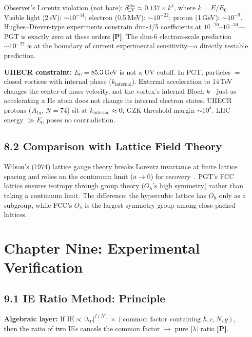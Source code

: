 \documentclass[11pt,a4paper]{article}
\newcommand{\gradeP}{\textbf{[P]}}
\begin{document}
Observer's Lorentz violation (not bare): $\delta_{\mathrm{LV}}^{\mathrm{obs}}\approx 0.137\times k^4$, where $k=E/E_0$. Visible light (2\,eV): $\sim 10^{-44}$; electron (0.5\,MeV): $\sim 10^{-22}$; proton (1\,GeV): $\sim 10^{-9}$. Hughes--Drever-type experiments constrain dim-4/5 coefficients at $10^{-20}$--$10^{-30}$---PGT is exactly zero at these orders \gradeP. The dim-6 electron-scale prediction $\sim 10^{-22}$ is at the boundary of current experimental sensitivity---a directly testable prediction.

\textbf{UHECR constraint:} $E_0=85.3$\,GeV is not a UV cutoff. In PGT, particles $=$ closed vortices with internal phase ($k_{\mathrm{internal}}$). External acceleration to 14\,TeV changes the center-of-mass velocity, not the vortex's internal Bloch $k$---just as accelerating a He atom does not change its internal electron states. UHECR protons ($A_{1g}$, $N=74$) sit at $k_{\mathrm{internal}}\approx 0$; GZK threshold margin $\sim 10^4$. LHC energy $\gg E_0$ poses no contradiction.

\subsection{8.2 Comparison with Lattice Field Theory}

Wilson's (1974) lattice gauge theory breaks Lorentz invariance at finite lattice spacing and relies on the continuum limit ($a\to 0$) for recovery~\cite{wilson}. PGT's FCC lattice ensures isotropy through group theory ($O_h$'s high symmetry) rather than taking a continuum limit. The difference: the hypercubic lattice has $O_h$ only as a subgroup, while FCC's $O_h$ is the largest symmetry group among close-packed lattices.

\section{Chapter Nine: Experimental Verification}\label{sec:ch9}

\subsection{9.1 IE Ratio Method: Principle}

\textbf{Algebraic layer:} If $\mathrm{IE}\propto|\lambda_\Gamma|^{f(N)}\times(\text{common factor containing }\hbar,c,N,g)$, then the ratio of two IEs cancels the common factor $\to$ pure $|\lambda|$ ratio \gradeP.
\end{document}
